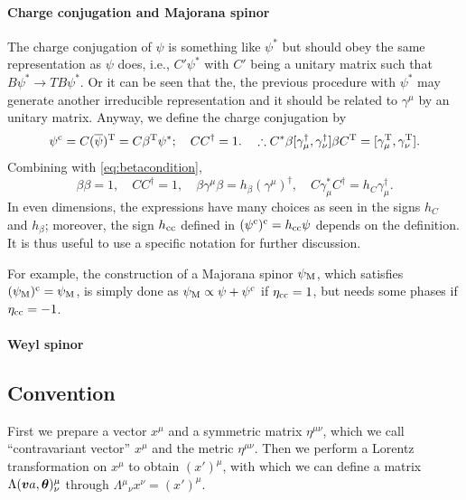 \documentclass[CheatSheet]{subfiles}
\begin{document}
\paragraph{Charge conjugation and Majorana spinor}
The charge conjugation of $\psi$ is something like $\psi^*$ but should obey the same representation as $\psi$ does, i.e., $C'\psi^*$ with $C'$ being a unitary matrix such that $B\psi^*\to TB\psi^*$. Or it can be seen that the, the previous procedure with $\psi^*$ may generate another irreducible representation and it should be related to $\gamma^\mu$ by an unitary matrix. Anyway, we define the charge conjugation by
\begin{equation}
 \psi^{\mathrm{c}} = C(\overline\psi)^{\mathrm{T}} = C\beta^{\mathrm{T}}\psi^*;\quad CC^\dagger = 1.
\quad
\therefore
C^*\beta[\gamma_\mu^\dagger,\gamma_\nu^\dagger]\beta C^{\mathrm{T}} =
[\gamma_\mu^{\mathrm{T}},\gamma_\nu^{\mathrm{T}}].
\end{equation}
Combining with \cref{eq:betacondition},
\begin{equation}
 \beta\beta=1,\quad C C^\dagger = 1,\quad
 \beta\gamma^\mu\beta=h_\beta(\gamma^\mu)^\dagger,\quad
 C\gamma_\mu^* C^\dagger = h_C\gamma_\mu^\dagger.
\end{equation}
In even dimensions, the expressions have many choices as seen in the signs $h_C$ and $h_\beta$; moreover, the sign $h_{\text{cc}}$ defined in $(\psi^{\mathrm{c}})^{\mathrm{c}}=h_{\text{cc}}\psi$ depends on the definition.
It is thus useful to use a specific notation for further discussion.

For example, the construction of a Majorana spinor $\psi_{\text{M}}$, which satisfies $(\psi_{\text{M}})^{\mathrm{c}}=\psi_{\text{M}}$, is simply done as $\psi_{\text{M}}\propto\psi+\psi^{\mathrm{c}}$ if $\eta_{\text{cc}}=1$, but needs some phases if $\eta_{\text{cc}}=-1$.

\paragraph{Weyl spinor}


\subsection[Convention]{Convention }
First we prepare a vector $x^\mu$ and a symmetric matrix $\eta^{\mu\nu}$, which we call ``contravariant vector'' $x^\mu$ and the metric $\eta^{\mu\nu}$.
Then we perform a Lorentz transformation on $x^\mu$ to obtain $(x')^\mu$, with which we can define a matrix $\Lambda({\boldsymbol{v}}a,{\boldsymbol{\theta}})^{\mu}_{\nu}$ through 
$\Lambda{}^\mu{}_\nu x^{\nu}=(x')^{\mu}$.
\end{document}

